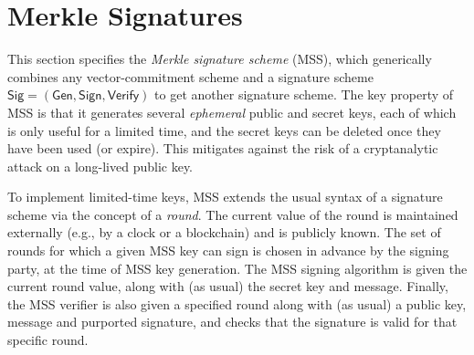 \documentclass[11pt,hidelinks]{article}
\newcommand{\algo}[1]{\ensuremath{\mathsf{#1}}}
\newcommand{\Verify}{\algo{Verify}}
\newcommand{\Sig}{\algo{Sig}}
\newcommand{\Gen}{\algo{Gen}}
\newcommand{\Sign}{\algo{Sign}}
\begin{document}



\section{Merkle Signatures}
\label{sec:merkle-signatures}

This section specifies the \emph{Merkle signature scheme} (MSS), which
generically combines any vector-commitment scheme and a signature
scheme $\Sig = (\Gen, \Sign, \Verify)$ to get another signature
scheme.  The key property of MSS is that it generates several
\emph{ephemeral} public and secret keys, each of which is only useful
for a limited time, and the secret keys can be deleted once they have
been used (or expire). This mitigates against the risk of a
cryptanalytic attack on a long-lived public key.

To implement limited-time keys, MSS extends the usual syntax of a
signature scheme via the concept of a \emph{round}. The current value
of the round is maintained externally (e.g., by a clock or a
blockchain) and is publicly known. The set of rounds for which a given
MSS key can sign is chosen in advance by the signing party, at the
time of MSS key generation. The MSS signing algorithm is given the
current round value, along with (as usual) the secret key and
message. Finally, the MSS verifier is also given a specified round
along with (as usual) a public key, message and purported signature,
and checks that the signature is valid for that specific round.
\end{document}
